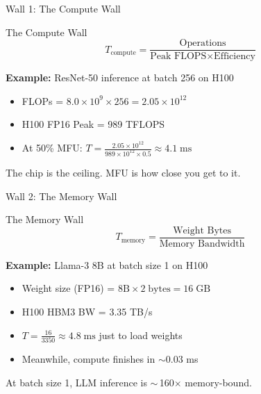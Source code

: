 \documentclass[aspectratio=169, 12pt]{beamer}
\newcommand{\wallbox}[2]{%
  \begin{block}{#1}#2\end{block}%
}
\begin{document}
\begin{frame}{Wall 1: The Compute Wall}

\small
\wallbox{The Compute Wall}{
\[
  T_{\text{compute}} = \frac{\text{Operations}}{\text{Peak FLOPS} \times \text{Efficiency}}
\]
}

\vspace{0.2cm}
\textbf{Example:} ResNet-50 inference at batch 256 on H100

\begin{itemize}
  \item FLOPs = $8.0 \times 10^{9} \times 256 = 2.05 \times 10^{12}$
  \item H100 FP16 Peak = 989 TFLOPS
  \item At 50\% MFU: $T = \frac{2.05 \times 10^{12}}{989 \times 10^{12} \times 0.5} \approx 4.1\;\text{ms}$
\end{itemize}

\vspace{0.2cm}
\alert{The chip is the ceiling. MFU is how close you get to it.}
\end{frame}

\begin{frame}{Wall 2: The Memory Wall}

\small
\wallbox{The Memory Wall}{
\[
  T_{\text{memory}} = \frac{\text{Weight Bytes}}{\text{Memory Bandwidth}}
\]
}

\vspace{0.2cm}
\textbf{Example:} Llama-3 8B at batch size 1 on H100

\begin{itemize}
  \item Weight size (FP16) = $8\text{B} \times 2\;\text{bytes} = 16\;\text{GB}$
  \item H100 HBM3 BW = 3.35 TB/s
  \item $T = \frac{16}{3350} \approx 4.8\;\text{ms}$ just to load weights
  \item Meanwhile, compute finishes in $\sim$0.03 ms
\end{itemize}

\vspace{0.2cm}
\alert{At batch size 1, LLM inference is $\sim$\,160$\times$ memory-bound.}
\end{frame}
\end{document}
